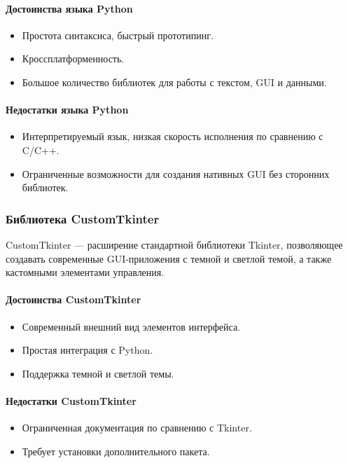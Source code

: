 \paragraph{Достоинства языка Python}
\begin{itemize}
	\item Простота синтаксиса, быстрый прототипинг.
	\item Кроссплатформенность.
	\item Большое количество библиотек для работы с текстом, GUI и данными.
\end{itemize}

\paragraph{Недостатки языка Python}
\begin{itemize}
	\item Интерпретируемый язык, низкая скорость исполнения по сравнению с C/C++.
	\item Ограниченные возможности для создания нативных GUI без сторонних библиотек.
\end{itemize}

\subsubsection{Библиотека CustomTkinter}

CustomTkinter — расширение стандартной библиотеки Tkinter, позволяющее создавать современные GUI-приложения с темной и светлой темой, а также кастомными элементами управления.

\paragraph{Достоинства CustomTkinter}
\begin{itemize}
	\item Современный внешний вид элементов интерфейса.
	\item Простая интеграция с Python.
	\item Поддержка темной и светлой темы.
\end{itemize}

\paragraph{Недостатки CustomTkinter}
\begin{itemize}
	\item Ограниченная документация по сравнению с Tkinter.
	\item Требует установки дополнительного пакета.
\end{itemize}


